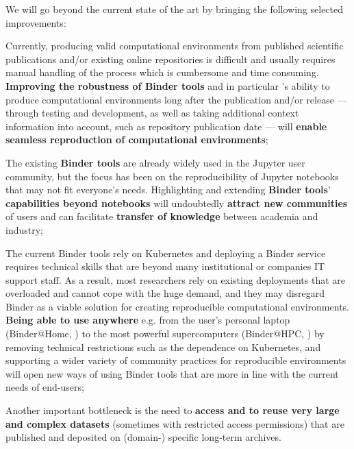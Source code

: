 We will go beyond the current state of the art by bringing the following selected improvements:
\begin{compactitem}
\item Currently, producing valid computational environments from published scientific publications and/or existing
      online repositories is difficult and usually requires manual handling of the process which is cumbersome and
      time consuming. \textbf{Improving the robustness of Binder tools} and in particular \repotodocker{}'s ability to
      produce computational environments long after the publication and/or
      release --- 
      through testing and development, as well as taking additional context information into account,
      such as repository publication date --- will \textbf{enable seamless
        reproduction of computational environments};
\item The existing \textbf{Binder tools} are already widely used in the Jupyter user community,
      but the focus has been on the reproducibility of Jupyter notebooks that may not fit everyone’s needs.
      Highlighting and extending \textbf{Binder tools}' \textbf{capabilities beyond notebooks}
      will undoubtedly \textbf{attract new communities} of users and can facilitate
      \textbf{transfer of knowledge} between academia and industry;
\item The current Binder tools rely on Kubernetes and deploying a Binder service requires technical skills that are
      beyond many institutional or companies IT support staff. As a result, most researchers rely on existing
      deployments that are overloaded and cannot cope with the huge demand, and they may disregard Binder
      as a viable solution for creating reproducible computational environments. \textbf{Being able to use \repotodocker{}
      anywhere} e.g. from the user’s personal laptop (Binder@Home, ) to the
      most powerful supercomputers (Binder@HPC, )
      by removing technical restrictions such as the dependence on Kubernetes,
      and supporting a wider variety of community practices for reproducible environments
      will open new ways of using Binder tools that are more in line with the current needs of end-users;
\item Another important bottleneck is the need to \textbf{access and to reuse very large and complex datasets} (sometimes
      with restricted access permissions) that are published and deposited on (domain-) specific long-term archives.

\end{compactitem}
